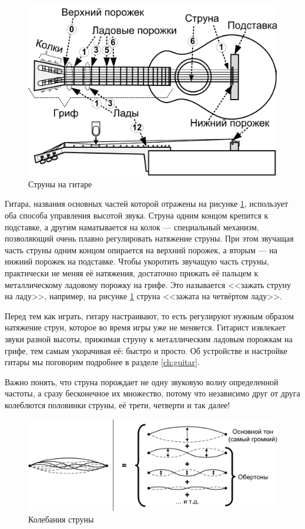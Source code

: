 \begin{figure}[!ht]
    \centering
    \includegraphics{fig/guitar-play} 
    \caption{Струны на гитаре}\label{fig:music:tone:guitar-play}
\end{figure} 

Гитара, названия основных частей которой отражены на рисунке \ref{fig:music:tone:guitar-play}, использует оба способа управления высотой звука. Струна одним концом крепится к подставке, а другим наматывается на колок --- специальный механизм, позволяющий очень плавно регулировать натяжение струны. При этом звучащая часть струны одним концом опирается на верхний порожек, а вторым --- на нижний порожек на подставке. Чтобы укоротить звучащую часть струны, практически не меняя её натяжения, достаточно прижать её пальцем к металлическому ладовому порожку на грифе. Это называется <<зажать струну на ладу>>, например, на рисунке \ref{fig:music:tone:guitar-play} струна <<зажата на четвёртом ладу>>.

Перед тем как играть, гитару настраивают, то есть регулируют нужным образом натяжение струн, которое во время игры уже не меняется. Гитарист извлекает звуки разной высоты, прижимая струну к металлическим ладовым порожкам на грифе, тем самым укорачивая её: быстро и просто. Об устройстве и настройке гитары мы поговорим подробнее в разделе \ref{ch:guitar}.

Важно понять, что струна порождает не одну звуковую волну определенной частоты, а сразу бесконечное их множество, потому что независимо друг от друга колеблются половинки струны, её трети, четверти и так далее!

\begin{figure}[!ht]
    \centering
    \includegraphics[width=\textwidth]{fig/string-moving} 
    \caption{Колебания струны}\label{fig:music:tone:stringmoving}
\end{figure} 

